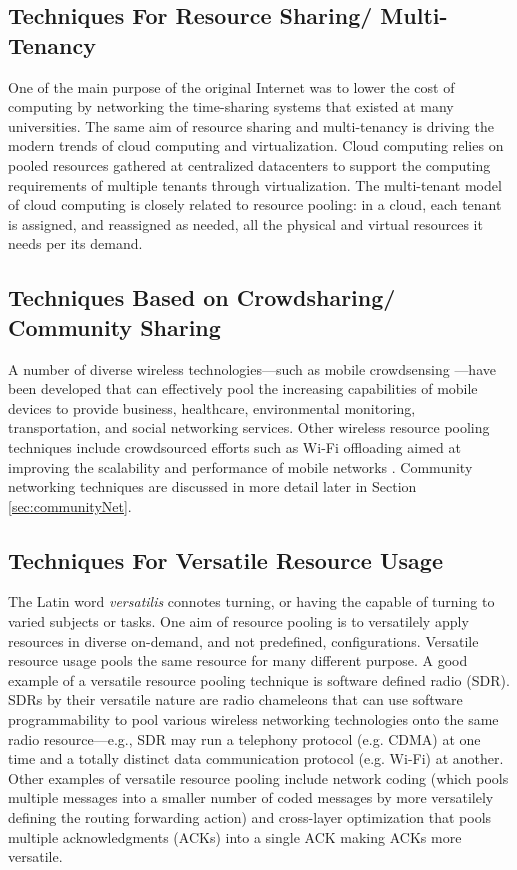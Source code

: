 \documentclass{sigcomm-alternate}
\begin{document}
\subsection{Techniques For Resource Sharing/ Multi-Tenancy}

One of the main purpose of the original Internet was to lower the cost of computing by networking the time-sharing systems that existed at many universities. The same aim of resource sharing and multi-tenancy is driving the modern trends of cloud computing and virtualization. Cloud computing relies on pooled resources gathered at centralized datacenters to support the computing requirements of multiple tenants through virtualization. The multi-tenant model of cloud computing is closely related to resource pooling: in a cloud, each tenant is assigned, and reassigned as needed, all the physical and virtual resources it needs per its demand. 

\subsection{Techniques Based on Crowdsharing/ Community Sharing}

A number of diverse wireless technologies---such as mobile crowdsensing \cite{lane2010survey}---have been developed that can effectively pool the increasing capabilities of mobile devices to provide business, healthcare, environmental monitoring, transportation, and social networking services. Other wireless resource pooling techniques include crowdsourced efforts such as Wi-Fi offloading aimed at improving the scalability and performance of mobile networks \cite{lee2010mobile}. Community networking techniques are discussed in more detail later in Section \ref{sec:communityNet}.



\subsection{Techniques For Versatile Resource Usage}

The Latin word \textit{versatilis} connotes turning, or having the capable of turning to varied subjects or tasks. One aim of resource pooling is to versatilely apply resources in diverse on-demand, and not predefined, configurations. Versatile resource usage pools the same resource for many different purpose. A good example of a versatile resource pooling technique is software defined radio (SDR). SDRs by their versatile nature are radio chameleons that can use software programmability to pool various wireless networking technologies onto the same radio resource---e.g., SDR may run a telephony protocol (e.g. CDMA) at one time and a totally distinct data communication protocol (e.g. Wi-Fi) at another. Other examples of versatile resource pooling include network coding (which pools multiple messages into a smaller number of coded messages by more versatilely defining the routing forwarding action) and cross-layer optimization that pools multiple acknowledgments (ACKs) into a single ACK making ACKs more versatile. 
\end{document}
